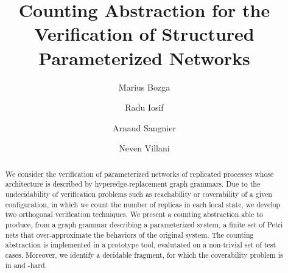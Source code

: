 \documentclass[]{llncs}
\newif\ifLongVersion\LongVersiontrue
\begin{document}

\title{Counting Abstraction for the Verification of Structured Parameterized Networks}

 \author{Marius Bozga \and Radu Iosif \and Arnaud Sangnier \and Neven Villani}

 \maketitle

\begin{abstract}
  We consider the verification of parameterized networks of replicated
  processes whose architecture is described by hyperedge-replacement
  graph grammars. Due to the undecidability of verification problems
  such as reachability or coverability of a given configuration, in
  which we count the number of replicas in each local state, we
  develop two orthogonal verification techniques. We present a
  counting abstraction able to produce, from a graph grammar
  describing a parameterized system, a finite set of Petri nets that
  over-approximate the behaviors of the original system. The counting
  abstraction is implemented in a prototype tool, evalutated on a
  non-trivial set of test cases. Moreover, we identify a decidable
  fragment, for which the coverability problem is in \twoexptime{}
  and \pspace-hard.
\end{abstract}











\ifLongVersion\else
\appendix
\newpage
\section{Proofs}
\label{app:proofs}
\printProofs[proofs]

\section{Quotients}
\label{app:quotients}
\printProofs[quotients]

\section{Initial Markings}
\label{app:initial}
\printProofs[initial]

\section{Lower Bound}
\label{app:lower-bound}
\printProofs[hardness]
\fi
\end{document}
